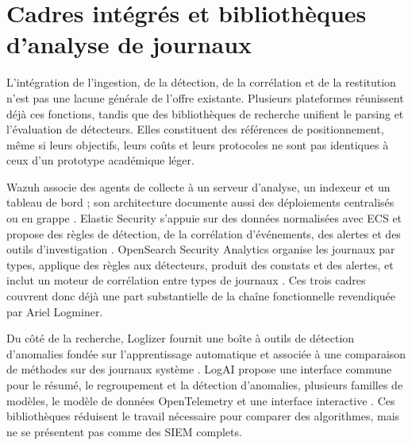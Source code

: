 
\section{Cadres intégrés et bibliothèques d'analyse de journaux}

L'intégration de l'ingestion, de la détection, de la corrélation et de la restitution
n'est pas une lacune générale de l'offre existante. Plusieurs plateformes réunissent déjà
ces fonctions, tandis que des bibliothèques de recherche unifient le parsing et
l'évaluation de détecteurs. Elles constituent des références de positionnement, même si
leurs objectifs, leurs coûts et leurs protocoles ne sont pas identiques à ceux d'un
prototype académique léger.

Wazuh associe des agents de collecte à un serveur d'analyse, un indexeur et un tableau de
bord ; son architecture documente aussi des déploiements centralisés ou en grappe
\cite{wazuh2026architecture}. Elastic Security s'appuie sur des données normalisées avec
ECS et propose des règles de détection, de la corrélation d'événements, des alertes et des
outils d'investigation \cite{elastic2026ecs,elastic2026security}. OpenSearch Security
Analytics organise les journaux par types, applique des règles aux détecteurs, produit
des constats et des alertes, et inclut un moteur de corrélation entre types de journaux
\cite{opensearch2026securityanalytics}. Ces trois cadres couvrent donc déjà une part
substantielle de la chaîne fonctionnelle revendiquée par Ariel Logminer.

Du côté de la recherche, Loglizer fournit une boîte à outils de détection d'anomalies
fondée sur l'apprentissage automatique et associée à une comparaison de méthodes sur des
journaux système \cite{he2016experience,logpai2026loglizer}. LogAI propose une interface
commune pour le résumé, le regroupement et la détection d'anomalies, plusieurs familles de
modèles, le modèle de données OpenTelemetry et une interface interactive
\cite{cheng2023logai}. Ces bibliothèques réduisent le travail nécessaire pour comparer des
algorithmes, mais ne se présentent pas comme des SIEM complets.

